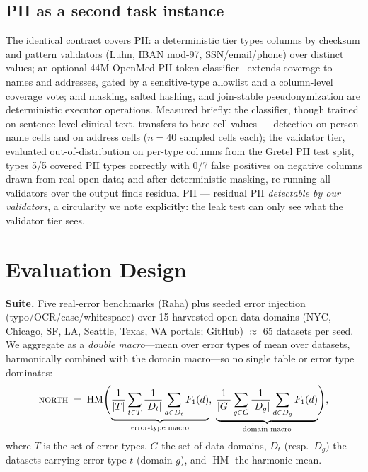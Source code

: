\documentclass[11pt]{article}
\begin{document}
\subsection{PII as a second task instance}
\label{sec:pii}
The identical contract covers PII: a deterministic tier types columns by checksum and
pattern validators (Luhn, IBAN mod-97, SSN/email/phone) over distinct values; an
optional 44M OpenMed-PII token classifier~\cite{openmed} extends coverage to names and
addresses, gated by a sensitive-type allowlist and a column-level coverage vote; and
masking, salted hashing, and join-stable pseudonymization are deterministic executor
operations. Measured briefly: the classifier, though trained on sentence-level
clinical text, transfers to bare cell values --- \piiNameBare{} detection on
person-name cells and \piiAddrBare{} on address cells ($n{=}40$ sampled cells each);
the validator tier, evaluated out-of-distribution on per-type columns from the Gretel
PII test split, types 5/5 covered PII types correctly with 0/7 false positives on
negative columns drawn from real open data; and after deterministic masking,
re-running all validators over the output finds \piiLeakRate{} residual PII ---
residual PII \emph{detectable by our validators}, a circularity we note explicitly:
the leak test can only see what the validator tier sees.

\section{Evaluation Design}
\label{sec:eval}
\textbf{Suite.} Five real-error benchmarks (Raha) plus seeded error injection
(typo/OCR/case/whitespace) over 15 harvested open-data domains (NYC, Chicago, SF, LA,
Seattle, Texas, WA portals; GitHub) $\approx$ 65 datasets per seed. We aggregate as a
\emph{double macro}---mean over error types of mean over datasets, harmonically combined
with the domain macro---so no single table or error type dominates:
\begin{equation*}
\textsc{north} \;=\; \operatorname{HM}\Biggl(
\underbrace{\frac{1}{|T|}\sum_{t \in T}\frac{1}{|D_t|}\sum_{d \in D_t} F_1(d)}_{\text{error-type macro}},\;
\underbrace{\frac{1}{|G|}\sum_{g \in G}\frac{1}{|D_g|}\sum_{d \in D_g} F_1(d)}_{\text{domain macro}}
\Biggr),
\end{equation*}
where $T$ is the set of error types, $G$ the set of data domains, $D_t$ (resp.\ $D_g$)
the datasets carrying error type $t$ (domain $g$), and $\operatorname{HM}$ the harmonic
mean.
\end{document}
